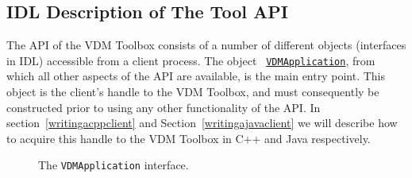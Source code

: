 \documentclass[\pformat,12pt]{article}
\newcommand{\VDMApplication}{\hyperlink{interface.VDMApplication}{VDMApplication}}
\begin{document}
\subsection{IDL Description of The Tool API}
\label{idldescriptiontool}

The API of the VDM Toolbox consists of a number of different objects
(interfaces in IDL) accessible from a client process. The object {\tt
  \VDMApplication}, from which all other aspects of the API are
available, is the main entry point. This object is the client's handle
to the VDM Toolbox, and must consequently be constructed prior to
using any other functionality of the API. In
section~\ref{writingacppclient} and Section~\ref{writingajavaclient}
we will describe how to acquire this handle to the VDM Toolbox in C++ 
and Java respectively.

\begin{figure}[tbh]
\begin{center}
\mbox{}
\caption{The {\tt VDMApplication} interface.}\label{fig:VDMApplication}
\end{center}
\end{figure}
\end{document}
